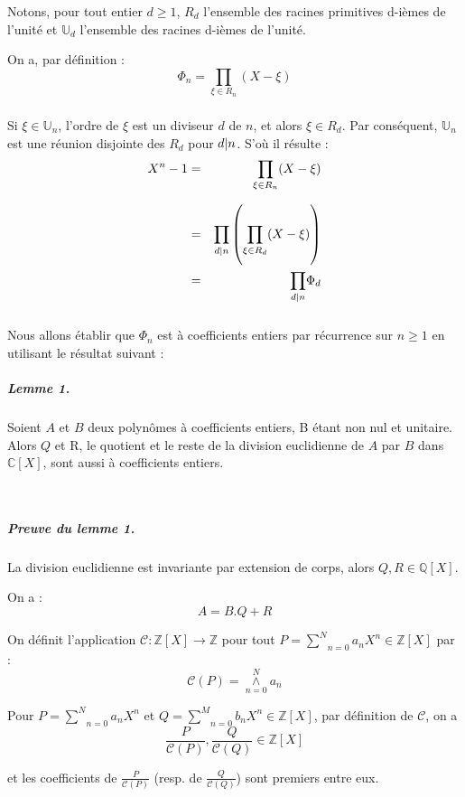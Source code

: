 Notons, pour tout entier $d \geqslant 1$, $R_d$ l'ensemble des racines
primitives d-i{\`e}mes de l'unit{\'e} et $\mathbb{U}_d$ l'ensemble des racines
d-i{\`e}mes de l'unit{\'e}.

On a, par d{\'e}finition :
\[ \Phi_n = \underset{}{\underset{\xi \in R_n}{\prod}} (X - \xi) \]


Si $\xi \in \mathbb{U}_n$, l'ordre de $\xi$ est un diviseur $d$ de $n$, et
alors $\xi \in R_d$. Par cons{\'e}quent, $\mathbb{U}_n$ est une r{\'e}union
disjointe des $R_d$ pour $d | n $. S'o{\`u} il r{\'e}sulte :
\begin{eqnarray*}
  X^n - 1 & = & \underset{}{\underset{\xi \in R_n}{\prod}} (X - \xi)\\
  & = & \underset{}{\underset{d | n }{\prod}} \left(
  \underset{}{\underset{\xi \in R_d}{\prod}} (X - \xi) \right)\\
  & = & \underset{}{\underset{d | n }{\prod}} \Phi_d
\end{eqnarray*}


Nous allons {\'e}tablir que $\Phi_n$ est {\`a} coefficients entiers par
r{\'e}currence sur $n \geqslant 1$ en utilisant le r{\'e}sultat suivant :

\subparagraph{Lemme 1.}

Soient $A$ et $B$ deux polyn{\^o}mes {\`a} coefficients entiers, B {\'e}tant
non nul et unitaire. Alors $Q$ et R, le quotient et le reste de la division
euclidienne de $A$ par $B$ dans $\mathbb{C} [X]$, sont aussi {\`a}
coefficients entiers.

\

\subparagraph{Preuve du lemme 1.}

La division euclidienne est invariante par extension de corps, alors $Q, R \in
\mathbb{Q} [X]$.

On a :
\[ A = B.Q + R \]


On d{\'e}finit l'application $\mathcal{C}: \mathbb{Z} [X] \rightarrow
\mathbb{Z}$ pour tout $P = \underset{n = 0}{\overset{N}{\sum}} a_n X^n \in
\mathbb{Z} [X]$ par :
\[ \mathcal{C} (P) = \underset{n = 0}{\overset{N}{\wedge}} a_n \]


Pour $P = \underset{n = 0}{\overset{N}{\sum}} a_n X^n$ et $Q = \underset{n =
0}{\overset{M}{\sum}} b_n X^n \in \mathbb{Z} [X]$, par d{\'e}finition de
$\mathcal{C}$, on a
\[ \frac{P}{\mathcal{C} (P)}, \frac{Q}{\mathcal{C} (Q)} \in \mathbb{Z} [X] \]


et les coefficients de $\frac{P}{\mathcal{C}(P)}$ (resp. de $\frac{Q}{\mathcal{C}(Q)}$) 
sont premiers entre eux.


